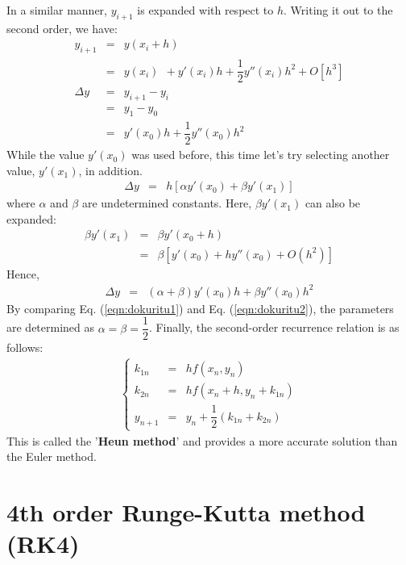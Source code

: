 \documentclass[uplatex,a4j,12pt,dvipdfmx]{jsarticle}
\begin{document}
In a similar manner,
$y_{i+1}$ is expanded with respect to $h$.
Writing it out to the second order, we have:
\begin{eqnarray}
	y_{i+1} &=&
	y(x_{i} + h)
	\nonumber \\[2mm] &=&
	y(x_{i}) \ \
	+
	y'(x_{i}) h
	+
	\dfrac{1}{2} y''(x_{i}) h^{2}
	+
	O[h^{3}]
	\\[4mm]
	\Delta y
	&=&
	y_{i+1} - y_{i}
	\nonumber \\[2mm] &=&
	y_{1} - y_{0}
	\nonumber \\[2mm] &=&
	y'(x_{0}) h
	+
	\dfrac{1}{2} y''(x_{0}) h^{2}
	\label{eqn:dokuritu1}
\end{eqnarray}
While the value $y'(x_{0})$ was used before,
this time let's try selecting another value, $y'(x_{1})$, in addition.
\begin{eqnarray}
	\Delta y
	&=&
	h [ \alpha y'(x_{0}) + \beta y'(x_{1}) ]
\end{eqnarray}
where $\alpha$ and $\beta$ are undetermined constants.
Here, $\beta y'(x_{1})$ can also be expanded:
\begin{eqnarray}
	\beta y'(x_{1})
	&=&
	\beta y'(x_{0}+h)
	\nonumber \\[2mm] &=&
	\beta [ y'(x_{0}) + h y''(x_{0}) +O(h^{2}) ]
\end{eqnarray}
Hence,
\begin{eqnarray}
	\Delta y
	&=&
	( \alpha + \beta ) y'(x_{0}) h + \beta y''(x_{0}) h^{2}
	\label{eqn:dokuritu2}
\end{eqnarray}
By comparing Eq. (\ref{eqn:dokuritu1}) and
Eq. (\ref{eqn:dokuritu2}),
the parameters are determined as $\alpha=\beta=\dfrac{1}{2}$.
Finally, the second-order recurrence relation is as follows:
\begin{eqnarray}
	\left\{
	\begin{array}{rcl}
		k_{1n}
		 & = &
		h f(x_{n},y_{n})
		\\[2mm]
		k_{2n}
		 & = &
		h f(x_{n}+h,y_{n}+k_{1n})
		\\[2mm]
		y_{n+1}
		 & = &
		y_{n} + \dfrac{1}{2} (k_{1n} + k_{2n})
	\end{array}
	\right.
\end{eqnarray}
This is called the '\textbf{Heun method}' and provides a more accurate solution than the Euler method.
\section{4th order Runge-Kutta method (RK4)}
\end{document}
